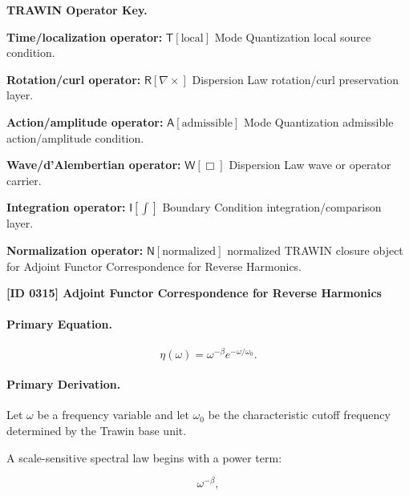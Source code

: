 \par\vspace{0.45\baselineskip}
\noindent\begin{minipage}[t]{\linewidth}
\begingroup
\small
\raggedright
\textbf{TRAWIN Operator Key.}\par
\noindent\textbf{Time/localization operator:} $\mathsf{T}\!\left[\mathrm{local}\right]$ Mode Quantization local source condition.\par
\noindent\textbf{Rotation/curl operator:} $\mathsf{R}\!\left[\nabla\times\right]$ Dispersion Law rotation/curl preservation layer.\par
\noindent\textbf{Action/amplitude operator:} $\mathsf{A}\!\left[\mathrm{admissible}\right]$ Mode Quantization admissible action/amplitude condition.\par
\noindent\textbf{Wave/d'Alembertian operator:} $\mathsf{W}\!\left[\Box\right]$ Dispersion Law wave or operator carrier.\par
\noindent\textbf{Integration operator:} $\mathsf{I}\!\left[\int\right]$ Boundary Condition integration/comparison layer.\par
\noindent\textbf{Normalization operator:} $\mathsf{N}\!\left[\mathrm{normalized}\right]$ normalized TRAWIN closure object for Adjoint Functor Correspondence for Reverse Harmonics.\par
\endgroup
\end{minipage}

\clearpage
\noindent\textbf{[ID 0315] Adjoint Functor Correspondence for Reverse Harmonics}\par
\vspace{0.35em}
\paragraph{Primary Equation.}
\begin{equation}
\eta(\omega)
=
\omega^{-\beta}
e^{-\omega/\omega_0}.
\end{equation}

\paragraph{Primary Derivation.}
Let $\omega$ be a frequency variable and let $\omega_0$ be the characteristic cutoff frequency determined by the Trawin base unit.

A scale-sensitive spectral law begins with a power term:

\begin{equation}
\omega^{-\beta},
\end{equation}

